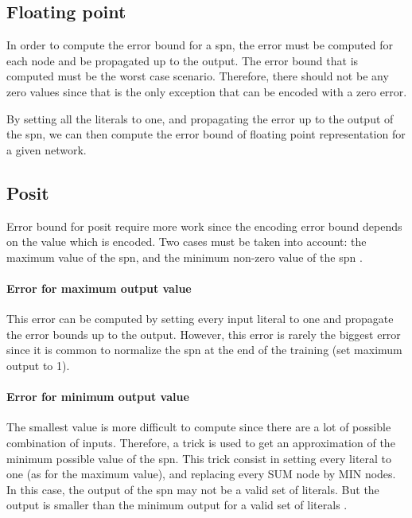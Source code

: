 \subsection{Floating point}

In order to compute the error bound for a \gls{spn}, the error must be computed for each node and be propagated up to the output. The error bound that is computed must be the worst case scenario. Therefore, there should not be any zero values since that is the only exception that can be encoded with a zero error.

By setting all the literals to one, and propagating the error up to the output of the \gls{spn}, we can then compute the error bound of floating point representation for a given network. 

\subsection{Posit}
Error bound for posit require more work since the encoding error bound depends on the value which is encoded. Two cases must be taken into account: the maximum value of the \gls{spn}, and the minimum non-zero value of the \gls{spn} . 

\paragraph{Error for maximum output value} This error can be computed by setting every input literal to one and propagate the error bounds up to the output. However, this error is rarely the biggest error since it is common to normalize the \gls{spn} at the end of the training (set maximum output to 1).

\paragraph{Error for minimum output value}

The smallest value is more difficult to compute since there are a lot of possible combination of inputs. Therefore, a trick is used to get an approximation of the minimum possible value of the \gls{spn}. This trick consist in setting every literal to one (as for the maximum value), and replacing every SUM node by MIN nodes. In this case, the output of the \gls{spn} may not be a valid set of literals. But the output is smaller than the minimum output for a valid set of literals .

